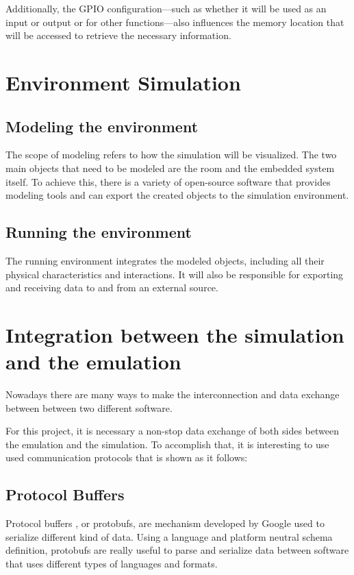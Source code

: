 \documentclass[../monografia.tex]{subfiles}
\begin{document}
Additionally, the GPIO configuration—such as whether it will be used as an input or output or for other functions—also influences the memory location that will be accessed to retrieve the necessary information.


\section{Environment Simulation}
\subsection{Modeling the environment}
The scope of modeling refers to how the simulation will be visualized. The two main objects that need to be modeled are the room and the embedded system itself. To achieve this, there is a variety of open-source software that provides modeling tools and can export the created objects to the simulation environment.

\subsection{Running the environment}
The running environment integrates the modeled objects, including all their physical characteristics and interactions. It will also be responsible for exporting and receiving data to and from an external source.

\section{Integration between the simulation and the emulation}
Nowadays there are many ways to make the interconnection and data exchange between between two different software.

For this project, it is necessary  a non-stop data exchange of both sides between the emulation and the simulation. To accomplish that, it is interesting to use used communication protocols that is shown as it follows:

\subsection{Protocol Buffers}
Protocol buffers \cite{google_protocol_buffers}, or protobufs, are mechanism developed by Google used to serialize different kind of data. Using a  language and platform neutral schema definition, protobufs are really useful to parse and serialize data between software that uses different types of languages and formats.
\end{document}
